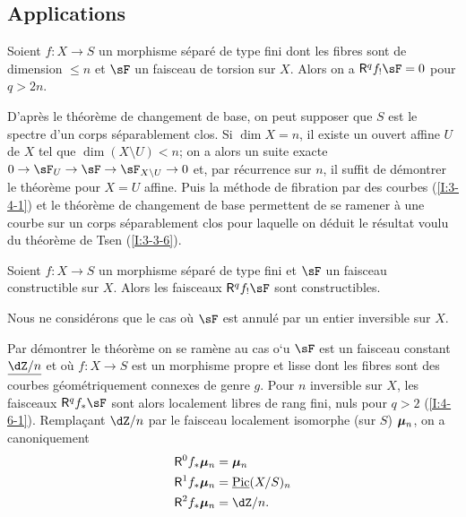 \subsection{Applications}\label{I:4-6}





\begin{theorem}[d'annulation]\label{I:4-6-1}
Soient $f:X\to S$ un morphisme séparé de type fini dont les fibres sont de 
dimension $\leqslant n$ et $\sF$ un faisceau de torsion sur $X$. Alors on a 
$\R^q f_! \sF = 0$ pour $q>2 n$. 
\end{theorem}

D'après le théorème de changement de base, on peut supposer que $S$ est 
le spectre d'un corps séparablement clos. Si $\dim X = n$, il existe un 
ouvert affine $U$ de $X$ tel que $\dim(X\setminus U) < n$; on a alors un suite 
exacte $0\to \sF_U \to \sF \to \sF_{X\setminus U} \to 0$ et, par récurrence sur $n$, 
il suffit de démontrer le théorème pour $X=U$ affine. Puis la méthode de 
fibration par des courbes (\ref{I:3-4-1}) et le théorème de changement de 
base permettent de se ramener à une courbe sur un corps séparablement clos 
pour laquelle on déduit le résultat voulu du théorème de Tsen 
(\ref{I:3-3-6}). 





\begin{theorem}[de finitude]\label{I:4-6-2}
Soient $f:X\to S$ un morphisme séparé de type fini et $\sF$ un faisceau 
constructible sur $X$. Alors les faisceaux $\R^q f_! \sF$ sont constructibles. 
\end{theorem}

Nous ne considérons que le cas où $\sF$ est annulé par un entier inversible 
sur $X$. 

Par démontrer le théorème on se ramène au cas o`u $\sF$ est un faisceau 
constant $\const{\dZ/n}$ et où $f:X\to S$ est un morphisme propre et lisse 
dont les fibres sont des courbes géométriquement connexes de genre $g$. 
Pour $n$ inversible sur $X$, les faisceaux $\R^q f_* \sF$ sont alors localement 
libres de rang fini, nuls pour $q>2$ (\ref{I:4-6-1}). Remplaçant $\dZ/n$ par le 
faisceau localement isomorphe (sur $S$) ${\bm\mu}_n$, on a canoniquement 
\begin{equation}\label{I:eq:4-6-2-1}
\begin{aligned}
  \R^0 f_* \dmu_n &= \dmu_n \\
  \R^1 f_* \dmu_n &= \const\pic(X/S)_n \\
  \R^2 f_* \dmu_n &= \dZ/n \text{.}
\end{aligned}
\end{equation}





